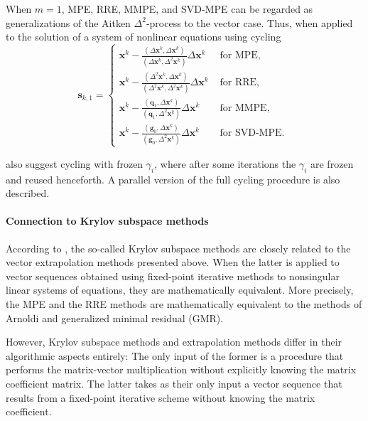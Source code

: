 When \(m=1\), MPE, RRE, MMPE, and SVD-MPE can be regarded as generalizations of the Aitken \(\Delta^2\)-process to the vector case.
Thus, when applied to the solution of a system of nonlinear equations using cycling
\begin{equation}
\mathbf{s}_{k, 1}=\begin{cases}
\mathbf x^{k}-\displaystyle\frac{\left(\Delta \mathbf x^{k}, \Delta \mathbf x^{k}\right)}{\left(\Delta \mathbf x^{k}, \Delta^{2} \mathbf x^{k}\right)} \Delta \mathbf x^{k} & \text { for MPE, } \\[10pt]
\mathbf x^{k}-\displaystyle\frac{\left(\Delta^{2} \mathbf x^{k}, \Delta\mathbf  x^{k}\right)}{\left(\Delta^{2} \mathbf x^{k}, \Delta^{2} \mathbf x^{k}\right)} \Delta \mathbf x^{k} & \text { for RRE, } \\[10pt]
\mathbf x^{k}-\displaystyle\frac{\left(\mathbf  q_{1}, \Delta \mathbf x^{k}\right)}{\left(\mathbf  q_{1}, \Delta^{2} \mathbf  x^{k}\right)} \Delta \mathbf x^{k} & \text { for MMPE, } \\[10pt]
\mathbf x^{k}-\displaystyle\frac{\left(\mathbf g_{0}, \Delta\mathbf x^{k}\right)}{\left( \mathbf g_{0}, \Delta^{2} \mathbf x^{k}\right)} \Delta \mathbf  x^{k} & \text { for SVD-MPE. }
\end{cases}
\end{equation}

\cite{sidi_vector_2017} also suggest cycling with frozen \(\gamma_i\), where after some iterations the \(\gamma_i\) are frozen and reused henceforth.
A parallel version of the full cycling procedure is also described.

\paragraph{Connection to Krylov subspace methods}

According to \cite{sidi_vector_2017}, the so-called Krylov subspace methods are closely related to the vector extrapolation methods presented above.
When the latter is applied to vector sequences obtained using fixed-point iterative methods to nonsingular linear systems of equations, they are mathematically equivalent.
More precisely, the MPE and the RRE methods are mathematically equivalent to the methods of Arnoldi and generalized minimal residual (GMR).

However, Krylov subspace methods and extrapolation methods differ in their algorithmic aspects entirely:
The only input of the former is a procedure that performs the matrix-vector multiplication without explicitly knowing the matrix coefficient matrix.
The latter takes as their only input a vector sequence that results from a fixed-point iterative scheme without knowing the matrix coefficient.

